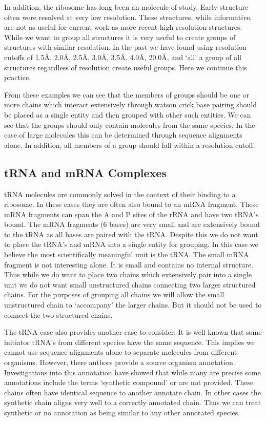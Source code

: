 In addition, the ribosome has long been an molecule of study. Early structure
\cite{Mueller2000} often were resolved at very low resolution. These structures,
while informative, are not as useful for current work as more recent high
resolution structures. While we want to group all structures it is very useful
to create groups of structures with similar resolution. In the past we have
found using resolution cutoffs of 1.5Å, 2.0Å, 2.5Å, 3.0Å, 3.5Å, 4.0Å, 20.0Å, and
‘all’ a group of all structures regardless of resolution create useful groups.
Here we continue this practice.

From these examples we can see that the members of groups should be one or more
chains which interact extensively through watson crick base pairing should be
placed as a single entity and then grouped with other such entities. We can see
that the groups should only contain molecules from the same species. In the case
of large molecules this can be determined through sequence alignments alone.
In addition, all members of a group should fall within a resolution cutoff.

\subsection{tRNA and mRNA Complexes}

tRNA molecules are commonly solved in the context of their binding to a
ribosome. In these cases they are often also bound to an mRNA fragment. These
mRNA fragments can span the A and P sites of the rRNA and have two tRNA’s bound.
The mRNA fragments (6 bases) are very small and are extensively bound to the
tRNA as all bases are paired with the tRNA. Despite this we do not want to place
the tRNA’s and mRNA into a single entity for grouping. In this case we believe
the most scientifically meaningful unit is the tRNA. The small mRNA fragment is
not interesting alone. It is small and contains no internal structure. Thus
while we do want to place two chains which extensively pair into a single unit
we do not want small unstructured chains connecting two larger structured
chains. For the purposes of grouping all chains we will allow the small
unstructured chain to ‘accompany’ the larger chains. But it should not be used
to connect the two structured chains.

The tRNA case also provides another case to consider. It is well known that some
initiator tRNA's from different species have the same sequence. This implies we
cannot use sequence alignments alone to separate molecules from different
organisms. However, there authors provide a source organism annotation.
Investigations into this annotation have showed that while many are precise some
annotations include the terms ‘synthetic compound’ or are not provided. These
chains often have identical sequence to another annotate chain. In other cases
the synthetic chain aligns very well to a correctly annotated chain. Thus we can
treat synthetic or no annotation as being similar to any other annotated
species.

